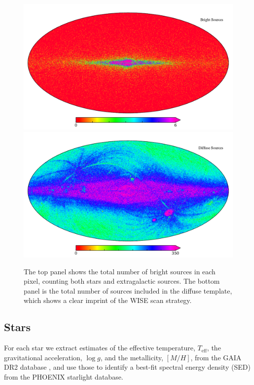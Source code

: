\documentclass{aa}
\begin{document}
\begin{figure}
  \centering
  \includegraphics[width=\columnwidth]{figs/sourcecount/source_count.pdf}\\
  \includegraphics[width=\columnwidth]{figs/sourcecount/diffuse_count.pdf}
  \caption{The top panel shows the total number of bright sources in each pixel, counting both stars and extragalactic sources. The bottom panel is the total number of sources included in the diffuse template, which shows a clear imprint of the WISE scan strategy.}
  \label{fig:starcount}
\end{figure}

\subsection{Stars}

\label{sec:starmodel}

For each star we extract estimates of the effective temperature, $T_{\mathrm{eff}}$, the gravitational acceleration, $\log g$, and the metallicity, $[M/H]$, from the GAIA DR2 database \cite{gaiaCat}, and use those to identify a best-fit spectral energy density (SED) from the PHOENIX starlight database. 
\end{document}
